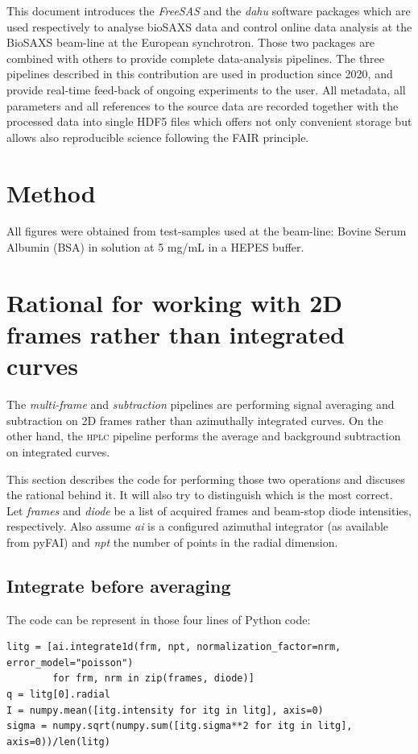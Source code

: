 \documentclass[preprint]{iucr}              %
\begin{document}
This document introduces the \textit{FreeSAS} and the \textit{dahu} software packages which are used respectively to analyse bioSAXS data 
and control online data analysis at the BioSAXS beam-line at the European synchrotron. 
Those two packages are combined with others to provide complete data-analysis pipelines.
The three pipelines described in this contribution are used in production since 2020, and provide real-time feed-back of ongoing experiments to the user.
All metadata, all parameters and all references to the source data are recorded together with the processed data into single HDF5 files which offers 
not only convenient storage but allows also reproducible science following the FAIR principle. 

\appendix
\section{Method}

All figures were obtained from test-samples used at the beam-line: Bovine Serum Albumin (BSA) in solution at 5 mg/mL in a HEPES buffer.

\section{Rational for working with 2D frames rather than integrated curves}
\label{rational}
The \textit{multi-frame} and \textit{subtraction} pipelines are performing signal averaging and subtraction on 2D frames rather than azimuthally integrated curves.
On the other hand, the \textsc{hplc} pipeline performs the average and background subtraction on integrated curves.

This section describes the code for performing those two operations and discuses the rational behind it.
It will also try to distinguish which is the most correct. 
Let \textit{frames} and \textit{diode} be a list of acquired frames and beam-stop diode intensities, respectively.
Also assume \textit{ai} is a configured azimuthal integrator (as available from pyFAI) and \textit{npt} the number of points in the radial dimension.

\subsection{Integrate before averaging}
The code can be represent in those four lines of Python code:
\begin{verbatim} 
litg = [ai.integrate1d(frm, npt, normalization_factor=nrm, error_model="poisson") 
        for frm, nrm in zip(frames, diode)]
q = litg[0].radial
I = numpy.mean([itg.intensity for itg in litg], axis=0)
sigma = numpy.sqrt(numpy.sum([itg.sigma**2 for itg in litg], axis=0))/len(litg)
\end{verbatim}
\end{document}
